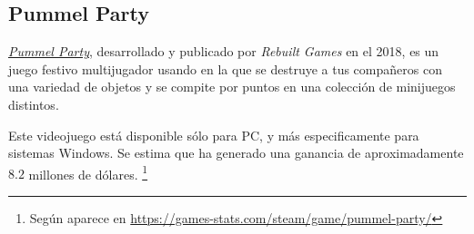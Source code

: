 \subsection{Pummel Party}

\href{http://www.rebuiltgames.com/}{\emph{Pummel Party}}, desarrollado y
publicado por \emph{Rebuilt Games} en el 2018, es un juego festivo multijugador
usando en la que se destruye a tus compañeros con una variedad de objetos y se
compite por puntos en una colección de minijuegos distintos.


Este videojuego está disponible sólo para PC, y más especificamente para
sistemas Windows. Se estima que ha generado una ganancia de aproximadamente
$8.2$ millones de dólares. \footnote{Según aparece en
\url{https://games-stats.com/steam/game/pummel-party/}}

